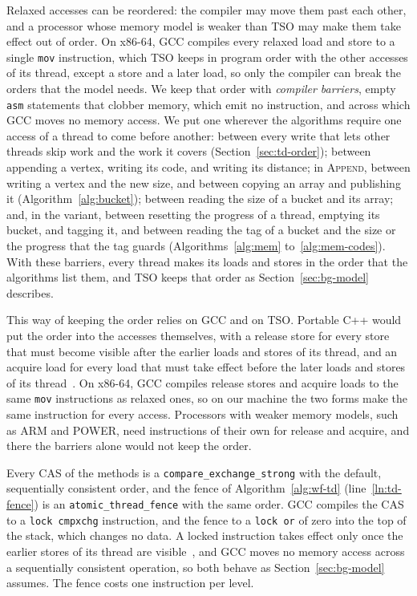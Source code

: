 Relaxed accesses can be reordered: the compiler may move them past each other, and a processor whose memory model is weaker than TSO may make them take effect out of order. On x86-64, GCC compiles every relaxed load and store to a single \texttt{mov} instruction, which TSO keeps in program order with the other accesses of its thread, except a store and a later load, so only the compiler can break the orders that the model needs. We keep that order with \emph{compiler barriers}, empty \texttt{asm} statements that clobber memory, which emit no instruction, and across which GCC moves no memory access. We put one wherever the algorithms require one access of a thread to come before another: between every write that lets other threads skip work and the work it covers (Section~\ref{sec:td-order}); between appending a vertex, writing its code, and writing its distance; in \textsc{Append}, between writing a vertex and the new size, and between copying an array and publishing it (Algorithm~\ref{alg:bucket}); between reading the size of a bucket and its array; and, in the variant, between resetting the progress of a thread, emptying its bucket, and tagging it, and between reading the tag of a bucket and the size or the progress that the tag guards (Algorithms~\ref{alg:mem} to~\ref{alg:mem-codes}). With these barriers, every thread makes its loads and stores in the order that the algorithms list them, and TSO keeps that order as Section~\ref{sec:bg-model} describes.

This way of keeping the order relies on GCC and on TSO. Portable C++ would put the order into the accesses themselves, with a release store for every store that must become visible after the earlier loads and stores of its thread, and an acquire load for every load that must take effect before the later loads and stores of its thread~\cite{boehm_cpp}. On x86-64, GCC compiles release stores and acquire loads to the same \texttt{mov} instructions as relaxed ones, so on our machine the two forms make the same instruction for every access. Processors with weaker memory models, such as ARM and POWER, need instructions of their own for release and acquire, and there the barriers alone would not keep the order.

Every CAS of the methods is a \texttt{compare\_exchange\_strong} with the default, sequentially consistent order, and the fence of Algorithm~\ref{alg:wf-td} (line~\ref{ln:td-fence}) is an \texttt{atomic\_thread\_fence} with the same order. GCC compiles the CAS to a \texttt{lock cmpxchg} instruction, and the fence to a \texttt{lock or} of zero into the top of the stack, which changes no data. A locked instruction takes effect only once the earlier stores of its thread are visible~\cite{intelmanual}, and GCC moves no memory access across a sequentially consistent operation, so both behave as Section~\ref{sec:bg-model} assumes. The fence costs one instruction per level.

